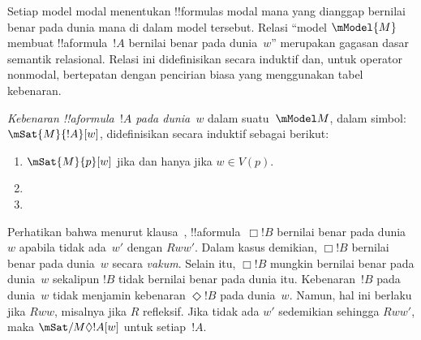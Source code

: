\documentclass[../../../include/open-logic-section]{subfiles}
\begin{document}


Setiap model modal menentukan !!{formula}s modal mana yang dianggap bernilai
benar pada dunia mana di dalam model tersebut. Relasi ``model $\mModel{M}$
membuat !!a{formula}~$!A$ bernilai benar pada dunia~$w$'' merupakan gagasan
dasar semantik relasional. Relasi ini didefinisikan secara induktif dan, untuk
operator nonmodal, bertepatan dengan pencirian biasa yang menggunakan tabel
kebenaran.

\begin{defn}
  \emph{Kebenaran !!a{formula}~$!A$ pada dunia~$w$} dalam suatu~$\mModel M$,
  dalam simbol: $\mSat{M}{!A}[w]$, didefinisikan secara induktif sebagai
  berikut:
  \begin{enumerate}
  \item $\mSat{M}{p}[w]$ jika dan hanya jika $w \in V(p)$.
  \item{}
  \item{}
  \end{enumerate}
\end{defn}

Perhatikan bahwa menurut klausa~,
!!a{formula}~$\Box !B$ bernilai benar pada dunia~$w$ apabila tidak ada~$w'$
dengan $Rww'$. Dalam kasus demikian, $\Box !B$ bernilai benar pada dunia~$w$
secara \emph{vakum}. Selain itu, $\Box !B$ mungkin bernilai benar pada
dunia~$w$ sekalipun $!B$ tidak bernilai benar pada dunia itu. Kebenaran~$!B$
pada dunia~$w$ tidak menjamin kebenaran $\Diamond !B$ pada dunia~$w$. Namun,
hal ini berlaku jika $Rww$, misalnya jika
$R$ refleksif. Jika tidak ada $w'$ sedemikian sehingga $Rww'$, maka
$\mSat/{M}{\Diamond !A}[w]$ untuk setiap~$!A$.
\end{document}
